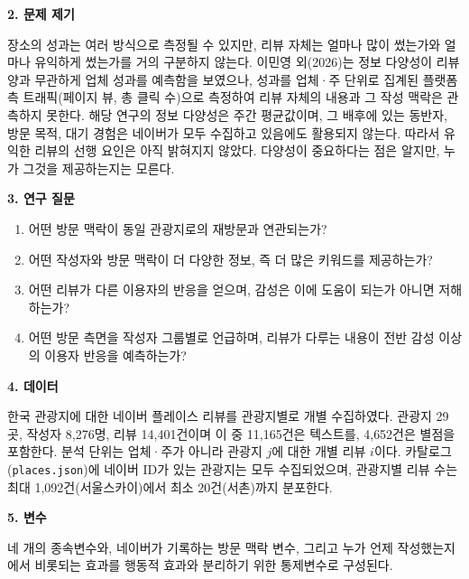 \documentclass[10pt,a4paper]{article}
\newcommand{\sect}[1]{\vspace{3pt}\noindent\textbf{#1}\par\vspace{1pt}}
\begin{document}
\sect{2. 문제 제기}
장소의 성과는 여러 방식으로 측정될 수 있지만, 리뷰 자체는 얼마나 많이 썼는가와 얼마나 유익하게
썼는가를 거의 구분하지 않는다. 이민영 외(2026)는 정보 다양성이 리뷰 양과 무관하게 업체 성과를
예측함을 보였으나, 성과를 업체·주 단위로 집계된 플랫폼 측 트래픽(페이지 뷰, 총 클릭 수)으로 측정하여
리뷰 자체의 내용과 그 작성 맥락은 관측하지 못한다. 해당 연구의 정보 다양성은 주간 평균값이며, 그
배후에 있는 동반자, 방문 목적, 대기 경험은 네이버가 모두 수집하고 있음에도 활용되지 않는다. 따라서
유익한 리뷰의 선행 요인은 아직 밝혀지지 않았다. 다양성이 중요하다는 점은 알지만, 누가 그것을
제공하는지는 모른다.

\sect{3. 연구 질문}
\begin{enumerate}[leftmargin=14pt, itemsep=0pt, topsep=1pt]
\item 어떤 방문 맥락이 동일 관광지로의 재방문과 연관되는가?
\item 어떤 작성자와 방문 맥락이 더 다양한 정보, 즉 더 많은 키워드를 제공하는가?
\item 어떤 리뷰가 다른 이용자의 반응을 얻으며, 감성은 이에 도움이 되는가 아니면 저해하는가?
\item 어떤 방문 측면을 작성자 그룹별로 언급하며, 리뷰가 다루는 내용이 전반 감성 이상의
      이용자 반응을 예측하는가?
\end{enumerate}

\sect{4. 데이터}
한국 관광지에 대한 네이버 플레이스 리뷰를 관광지별로 개별 수집하였다. 관광지 29곳, 작성자 8{,}276명,
리뷰 14{,}401건이며 이 중 11{,}165건은 텍스트를, 4{,}652건은 별점을 포함한다. 분석 단위는 업체·주가 아니라
관광지 $j$에 대한 개별 리뷰 $i$이다. 카탈로그(\texttt{places.json})에 네이버 ID가 있는 관광지는 모두
수집되었으며, 관광지별 리뷰 수는 최대 1{,}092건(서울스카이)에서 최소 20건(서촌)까지 분포한다.

\tblPlaces

\sect{5. 변수}
네 개의 종속변수와, 네이버가 기록하는 방문 맥락 변수, 그리고 누가 언제 작성했는지에서 비롯되는 효과를
행동적 효과와 분리하기 위한 통제변수로 구성된다.

\tblVariables
\end{document}
